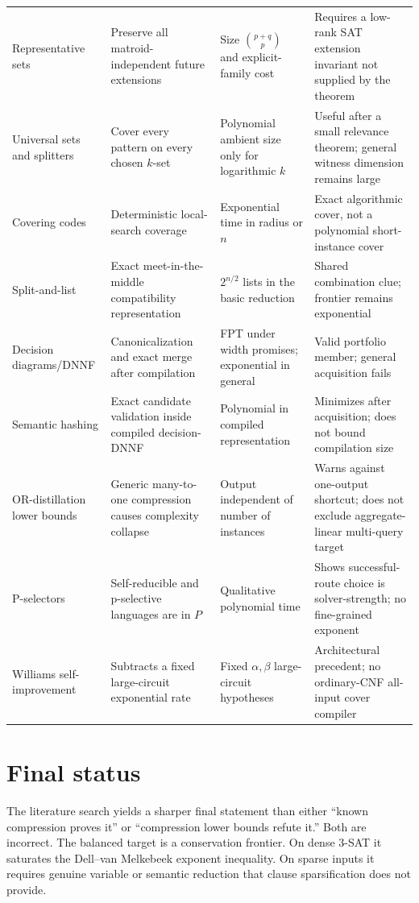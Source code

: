 \documentclass[11pt]{article}
\begin{document}
\begin{longtable}{@{}p{}p{}p{}p{}@{}}
Representative sets & Preserve all matroid-independent future extensions & Size $\binom{p+q}{p}$ and explicit-family cost & Requires a low-rank SAT extension invariant not supplied by the theorem \\
Universal sets and splitters & Cover every pattern on every chosen $k$-set & Polynomial ambient size only for logarithmic $k$ & Useful after a small relevance theorem; general witness dimension remains large \\
Covering codes & Deterministic local-search coverage & Exponential time in radius or $n$ & Exact algorithmic cover, not a polynomial short-instance cover \\
Split-and-list & Exact meet-in-the-middle compatibility representation & $2^{n/2}$ lists in the basic reduction & Shared combination clue; frontier remains exponential \\
Decision diagrams/DNNF & Canonicalization and exact merge after compilation & FPT under width promises; exponential in general & Valid portfolio member; general acquisition fails \\
Semantic hashing & Exact candidate validation inside compiled decision-DNNF & Polynomial in compiled representation & Minimizes after acquisition; does not bound compilation size \\
OR-distillation lower bounds & Generic many-to-one compression causes complexity collapse & Output independent of number of instances & Warns against one-output shortcut; does not exclude aggregate-linear multi-query target \\
P-selectors & Self-reducible and p-selective languages are in $P$ & Qualitative polynomial time & Shows successful-route choice is solver-strength; no fine-grained exponent \\
Williams self-improvement & Subtracts a fixed large-circuit exponential rate & Fixed $\alpha,\beta$ large-circuit hypotheses & Architectural precedent; no ordinary-CNF all-input cover compiler \\
\bottomrule
\end{longtable}

\section{Final status}

The literature search yields a sharper final statement than either ``known
compression proves it'' or ``compression lower bounds refute it.''  Both are
incorrect.  The balanced target is a conservation frontier.  On dense
$3$-SAT it saturates the Dell--van Melkebeek exponent inequality.  On sparse
inputs it requires genuine variable or semantic reduction that clause
sparsification does not provide.
\end{document}

